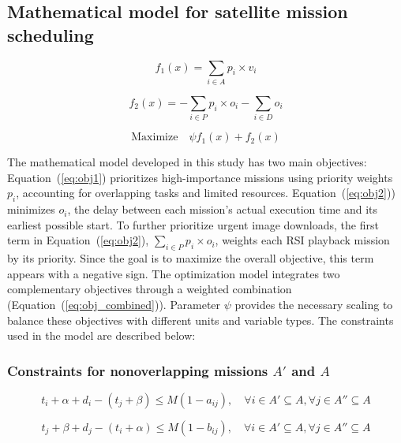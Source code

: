 \documentclass[preprint,3p,12pt,authoryear]{elsarticle}
\begin{document}
\subsection{Mathematical model for satellite mission scheduling}

\begin{equation}
f_1(x) = \sum_{i \in A} p_i \times v_i \label{eq:obj1}
\end{equation}

\begin{equation}
f_2(x) = -\sum_{i \in P} p_i \times o_i - \sum_{i \in D} o_i \label{eq:obj2}
\end{equation}

\begin{equation}
\text{Maximize} \quad \psi f_1(x)+f_2(x) \label{eq:obj_combined}
\end{equation}

The mathematical model developed in this study has two main objectives: Equation~(\ref{eq:obj1}) prioritizes high-importance missions using priority weights $p_i$, accounting for overlapping tasks and limited resources. Equation~(\ref{eq:obj2})) minimizes $o_i$, the delay between each mission’s actual execution time and its earliest possible start. To further prioritize urgent image downloads, the first term in Equation~(\ref{eq:obj2}), $\sum_{i \in P} p_i \times o_i$, weights each RSI playback mission by its priority. Since the goal is to maximize the overall objective, this term appears with a negative sign. The optimization model integrates two complementary objectives through a weighted combination (Equation~(\ref{eq:obj_combined})). Parameter $\psi$ provides the necessary scaling to balance these objectives with different units and variable types. The constraints used in the model are described below:

\subsubsection{Constraints for nonoverlapping missions $A'$ and $A$}
\begin{equation}
t_i+\alpha+d_i-(t_j+\beta) \le M(1-a_{ij}), \quad \forall i \in A' \subseteq A, \forall j \in A'' \subseteq A \label{eq:nonoverlap1}
\end{equation}

\begin{equation}
t_j+\beta+d_j-(t_i+\alpha) \le M(1-b_{ij}), \quad \forall i \in A' \subseteq A, \forall j \in A'' \subseteq A \label{eq:nonoverlap2}
\end{equation}
\end{document}
